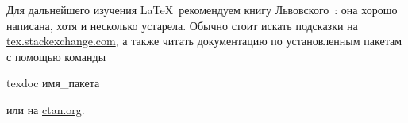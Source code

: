 Для дальнейшего изучения \LaTeX\ рекомендуем книгу Львовского~\autocite{Lvo2003}: она хорошо написана, хотя и несколько устарела.
Обычно стоит искать подсказки на
\href{http://tex.stackexchange.com/}{tex.stackexchange.com}, а также
читать документацию по установленным пакетам с помощью
команды
\begin{Verb}
texdoc имя_пакета
\end{Verb}
или на \href{http://ctan.org/}{ctan.org}.

\printbibliography[%
    heading=bibintoc%
]


